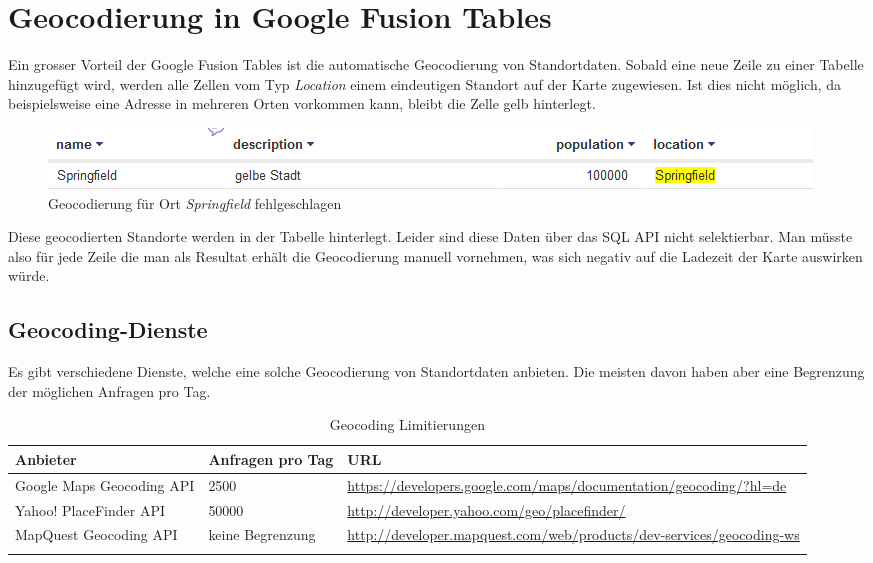 \section{Geocodierung in Google Fusion Tables}
\label{gft-geocoding}
Ein grosser Vorteil der Google Fusion Tables ist die automatische 
\gls{Geocodierung} von Standortdaten. Sobald eine neue Zeile zu einer Tabelle hinzugefügt wird, werden alle Zellen vom Typ \emph{Location} einem eindeutigen Standort auf der Karte zugewiesen. Ist dies nicht möglich, da beispielsweise eine Adresse in mehreren Orten vorkommen kann, bleibt die Zelle gelb hinterlegt.

\begin{figure}[!h]
	\centering
	\includegraphics[scale=0.75]{images/einfuehrung/geocoding_failed.png}
	\caption{Geocodierung für Ort \emph{Springfield} fehlgeschlagen}
	\label{geocoding_failed}
\end{figure}

Diese geocodierten Standorte werden in der Tabelle hinterlegt. Leider sind diese Daten über das SQL API nicht selektierbar. Man müsste also für jede Zeile die man als Resultat erhält die Geocodierung manuell vornehmen, was sich negativ auf die Ladezeit der Karte auswirken würde.

\subsection{Geocoding-Dienste}
Es gibt verschiedene Dienste, welche eine solche Geocodierung von Standortdaten anbieten. Die meisten davon haben aber eine Begrenzung der möglichen Anfragen pro Tag.

\begin{longtable}{|l|p{1.9cm}|p{7.3cm}|}
\hline 
\textbf{Anbieter} & \textbf{Anfragen pro Tag} & \textbf{URL} \\ 
\hline 
Google Maps Geocoding API & 2500 & \url{https://developers.google.com/maps/documentation/geocoding/?hl=de} \\ 
\hline 
Yahoo! PlaceFinder API & 50000 & \url{http://developer.yahoo.com/geo/placefinder/} \\ 
\hline 
MapQuest Geocoding API & keine Begrenzung & \url{http://developer.mapquest.com/web/products/dev-services/geocoding-ws} \\ 
\hline 
\caption{Geocoding Limitierungen}
\end{longtable} 

